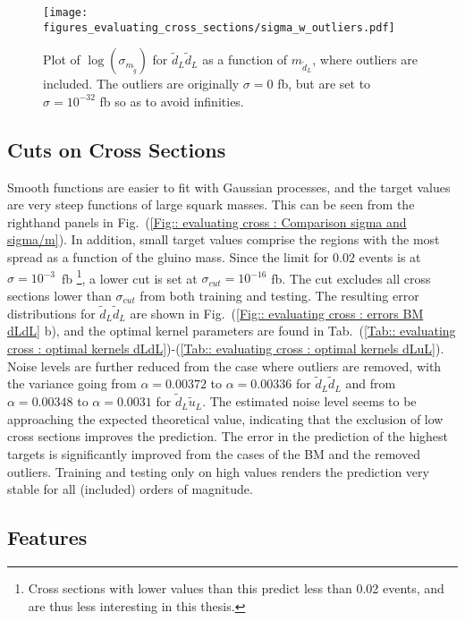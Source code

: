 \documentclass[twoside,english]{uiofysmaster}
\begin{document}
\begin{figure}
\centering
\texttt{[image: figures\_evaluating\_cross\_sections/sigma\_w\_outliers.pdf]}
\caption{Plot of $\log( \sigma_{m_{\tilde{g}}})$ for $\tilde{d}_L \tilde{d}_L$ as a function of $m_{\tilde{d}_L}$, where outliers are included. The outliers are originally $\sigma=0$ fb, but are set to $\sigma =10^{-32}$ fb so as to avoid infinities.}
\label{Fig:: evaluating cross : sigma w outliers}
\end{figure}

\subsection{Cuts on Cross Sections}

Smooth functions are easier to fit with Gaussian processes, and the target values are very steep functions of large squark masses. This can be seen from the righthand panels in Fig.\ (\ref{Fig:: evaluating cross : Comparison sigma and sigma/m}). In addition, small target values comprise the regions with the most spread as a function of the gluino mass. Since the limit for $0.02$ events is at $\sigma = 10^{-3}$~fb \footnote{Cross sections with lower values than this predict less than 0.02 events, and are thus less interesting in this thesis.}, a lower cut is set at $\sigma_{cut} = 10^{-16}$ fb. The cut excludes all cross sections lower than $\sigma_{cut}$ from both training and testing. The resulting error distributions for $\tilde{d}_L \tilde{d}_L$ are shown in Fig.\ (\ref{Fig:: evaluating cross : errors BM dLdL} b), and the optimal kernel parameters are found in Tab.\ (\ref{Tab:: evaluating cross : optimal kernels dLdL})-(\ref{Tab:: evaluating cross : optimal kernels dLuL}). Noise levels are further reduced from the case where outliers are removed, with the variance going from $\alpha=0.00372$ to $\alpha = 0.00336$ for $\tilde{d}_L \tilde{d}_L$ and from $\alpha=0.00348$ to $\alpha=0.0031$ for $\tilde{d}_L \tilde{u}_L$. The estimated noise level seems to be approaching the expected theoretical value, indicating that the exclusion of low cross sections improves the prediction. The error in the prediction of the highest targets is significantly improved from the cases of the BM and the removed outliers. Training and testing only on high values renders the prediction very stable for all (included) orders of magnitude.

\subsection{Features}
\end{document}
